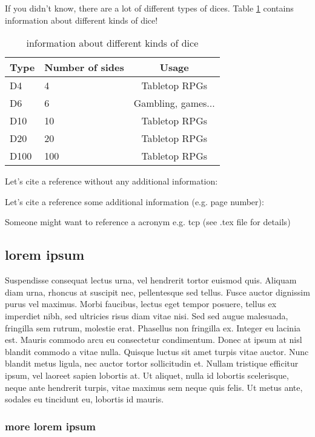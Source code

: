 \documentclass[english]{jamk-report}
\begin{document}
If you didn't know, there are a lot of different types of dices. Table \ref{table:dicetypes} contains information about different kinds of dice!

\begin{table}[h]\centering
{}
    \begin{tabularx}{\textwidth-1em}{llc} \toprule
        \textbf{Type} & \textbf{Number of sides} & \textbf{Usage} \\ \midrule
        D4 & 4 & Tabletop RPGs \\
        D6 & 6 & Gambling, games... \\
        D10 & 10 & Tabletop RPGs \\
        D20 & 20 & Tabletop RPGs \\
        D100 & 100 & Tabletop RPGs \\
        \bottomrule
    \end{tabularx}
\caption{information
about different kinds of dice}
\label{table:dicetypes}
\end{table}

Let's cite a reference without any additional information: ~\cite{einstein}

Let's cite a reference some additional information (e.g. page number): ~\parencite[32]{einstein}

Someone might want to reference a acronym e.g. \ac{tcp} (see .tex file for details)

\subsection{lorem ipsum}

Suspendisse consequat lectus urna, vel hendrerit tortor euismod quis. Aliquam
diam urna, rhoncus at suscipit nec, pellentesque sed tellus. Fusce auctor
dignissim purus vel maximus. Morbi faucibus, lectus eget tempor posuere, tellus
ex imperdiet nibh, sed ultricies risus diam vitae nisi. Sed sed augue
malesuada, fringilla sem rutrum, molestie erat.  Phasellus non fringilla ex.
Integer eu lacinia est. Mauris commodo arcu eu consectetur condimentum. Donec
at ipsum at nisl blandit commodo a vitae nulla.  Quisque luctus sit amet turpis
vitae auctor. Nunc blandit metus ligula, nec auctor tortor sollicitudin et.
Nullam tristique efficitur ipsum, vel laoreet sapien lobortis at. Ut aliquet,
nulla id lobortis scelerisque, neque ante hendrerit turpis, vitae maximus sem
neque quis felis. Ut metus ante, sodales eu tincidunt eu, lobortis id mauris.

\subsubsection{more lorem ipsum}
\end{document}
